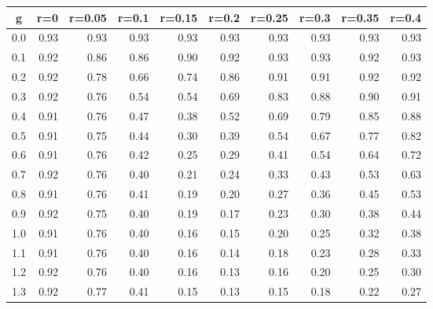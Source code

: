 %
\begin{table}[!tbp]
 \begin{center}
 \begin{tabular}{rrrrrrrrrr}\hline\hline
\multicolumn{1}{c}{g}&\multicolumn{1}{c}{r=0}&\multicolumn{1}{c}{r=0.05}&\multicolumn{1}{c}{r=0.1}&\multicolumn{1}{c}{r=0.15}&\multicolumn{1}{c}{r=0.2}&\multicolumn{1}{c}{r=0.25}&\multicolumn{1}{c}{r=0.3}&\multicolumn{1}{c}{r=0.35}&\multicolumn{1}{c}{r=0.4}\tabularnewline
\hline
0.0&0.93&0.93&0.93&0.93&0.93&0.93&0.93&0.93&0.93\tabularnewline
0.1&0.92&0.86&0.86&0.90&0.92&0.93&0.93&0.92&0.93\tabularnewline
0.2&0.92&0.78&0.66&0.74&0.86&0.91&0.91&0.92&0.92\tabularnewline
0.3&0.92&0.76&0.54&0.54&0.69&0.83&0.88&0.90&0.91\tabularnewline
0.4&0.91&0.76&0.47&0.38&0.52&0.69&0.79&0.85&0.88\tabularnewline
0.5&0.91&0.75&0.44&0.30&0.39&0.54&0.67&0.77&0.82\tabularnewline
0.6&0.91&0.76&0.42&0.25&0.29&0.41&0.54&0.64&0.72\tabularnewline
0.7&0.92&0.76&0.40&0.21&0.24&0.33&0.43&0.53&0.63\tabularnewline
0.8&0.91&0.76&0.41&0.19&0.20&0.27&0.36&0.45&0.53\tabularnewline
0.9&0.92&0.75&0.40&0.19&0.17&0.23&0.30&0.38&0.44\tabularnewline
1.0&0.91&0.76&0.40&0.16&0.15&0.20&0.25&0.32&0.38\tabularnewline
1.1&0.91&0.76&0.40&0.16&0.14&0.18&0.23&0.28&0.33\tabularnewline
1.2&0.92&0.76&0.40&0.16&0.13&0.16&0.20&0.25&0.30\tabularnewline
1.3&0.92&0.77&0.41&0.15&0.13&0.15&0.18&0.22&0.27\tabularnewline
\hline
\end{tabular}

\end{center}

\end{table}

